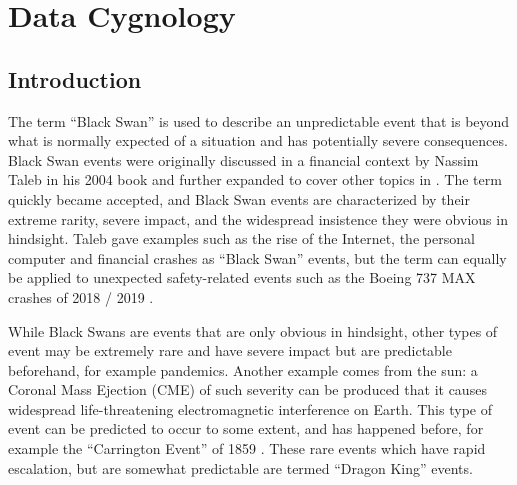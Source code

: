 %
\chapter{Data Cygnology}\label{bkm:cygnology}
%

\section{Introduction}
The term “Black Swan” is used to describe an unpredictable event that is beyond what is normally expected of a situation and has potentially severe consequences.
Black Swan events were originally discussed in a financial context by Nassim Taleb in his 2004 book
 \cite{citation:cyg:RoleOfChance}
and further expanded to cover other topics in
\cite{citation:cyg:BlackSwan}.
The term quickly became accepted, and Black Swan events are characterized by their extreme rarity, severe impact, and the widespread insistence they were obvious in hindsight. Taleb gave examples such as the rise of the Internet, the personal computer and financial crashes as “Black Swan” events, but the term can equally be applied to unexpected safety-related events such as the Boeing 737 MAX crashes of 2018 / 2019 \cite{citation:cyg:737Max}.

While Black Swans are events that are only obvious in hindsight, other types of event may be extremely rare and have severe impact but are predictable beforehand, for example pandemics.
Another example comes from the sun:  a Coronal Mass Ejection (CME) of such severity can be produced that it causes widespread life-threatening electromagnetic interference on Earth.
This type of event can be predicted to occur to some extent, and has happened before, for example the “Carrington Event” of 1859 \cite{citation:cyg:carrington}.
These rare events which have rapid escalation, but are somewhat predictable are termed “Dragon King” events.

